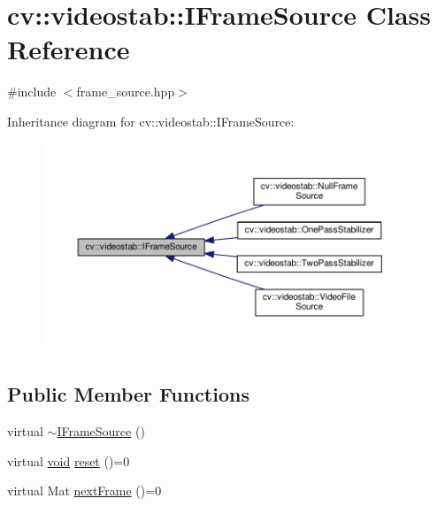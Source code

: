 \hypertarget{classcv_1_1videostab_1_1IFrameSource}{\section{cv\-:\-:videostab\-:\-:I\-Frame\-Source Class Reference}
\label{classcv_1_1videostab_1_1IFrameSource}
}


{\ttfamily \#include $<$frame\-\_\-source.\-hpp$>$}



Inheritance diagram for cv\-:\-:videostab\-:\-:I\-Frame\-Source\-:\nopagebreak
\begin{figure}[H]
\begin{center}
\leavevmode
\includegraphics[width=350pt]{classcv_1_1videostab_1_1IFrameSource__inherit__graph}
\end{center}
\end{figure}
\subsection*{Public Member Functions}
\begin{DoxyCompactItemize}
\item 
virtual \hyperlink{classcv_1_1videostab_1_1IFrameSource_ae6a9b158bb17a7320bcb767965033ea7}{$\sim$\-I\-Frame\-Source} ()
\item 
virtual \hyperlink{legacy_8hpp_a8bb47f092d473522721002c86c13b94e}{void} \hyperlink{classcv_1_1videostab_1_1IFrameSource_a4aca86a6810f2330f4934db4dce65822}{reset} ()=0
\item 
virtual Mat \hyperlink{classcv_1_1videostab_1_1IFrameSource_a9f20adf64db74c9673eccf8d75f88ad8}{next\-Frame} ()=0
\end{DoxyCompactItemize}


